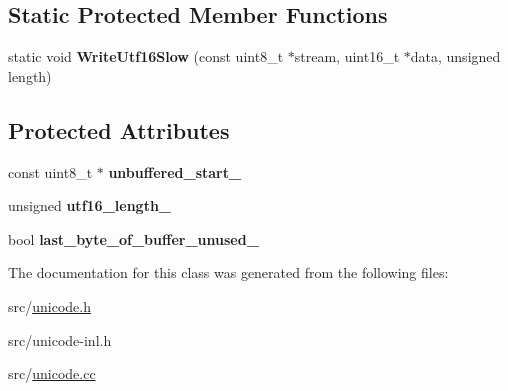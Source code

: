\subsection*{Static Protected Member Functions}
\begin{DoxyCompactItemize}
\item 
\hypertarget{classunibrow_1_1_utf8_decoder_base_ae00039fce91020602bc783fbc2079f18}{}static void {\bfseries Write\+Utf16\+Slow} (const uint8\+\_\+t $\ast$stream, uint16\+\_\+t $\ast$data, unsigned length)\label{classunibrow_1_1_utf8_decoder_base_ae00039fce91020602bc783fbc2079f18}

\end{DoxyCompactItemize}
\subsection*{Protected Attributes}
\begin{DoxyCompactItemize}
\item 
\hypertarget{classunibrow_1_1_utf8_decoder_base_a620ab5ad498ac7c203e22b40a1354480}{}const uint8\+\_\+t $\ast$ {\bfseries unbuffered\+\_\+start\+\_\+}\label{classunibrow_1_1_utf8_decoder_base_a620ab5ad498ac7c203e22b40a1354480}

\item 
\hypertarget{classunibrow_1_1_utf8_decoder_base_ada8d37bd63a78c28b96cf0267316d765}{}unsigned {\bfseries utf16\+\_\+length\+\_\+}\label{classunibrow_1_1_utf8_decoder_base_ada8d37bd63a78c28b96cf0267316d765}

\item 
\hypertarget{classunibrow_1_1_utf8_decoder_base_a4d7b287ba276aca48744da8576209ddd}{}bool {\bfseries last\+\_\+byte\+\_\+of\+\_\+buffer\+\_\+unused\+\_\+}\label{classunibrow_1_1_utf8_decoder_base_a4d7b287ba276aca48744da8576209ddd}

\end{DoxyCompactItemize}


The documentation for this class was generated from the following files\+:\begin{DoxyCompactItemize}
\item 
src/\hyperlink{unicode_8h}{unicode.\+h}\item 
src/unicode-\/inl.\+h\item 
src/\hyperlink{unicode_8cc}{unicode.\+cc}\end{DoxyCompactItemize}
